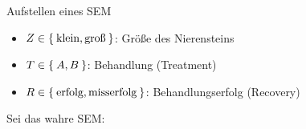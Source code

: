 \begin{frame}{Aufstellen eines SEM}
    \begin{itemize}[label={}]
        \item $Z \in \Set{\text{klein}, \text{groß}}$: Größe des Nierensteins
        \item $T \in \Set{A, B}$: Behandlung (Treatment)
        \item $R \in \Set{\text{erfolg}, \text{misserfolg}}$: Behandlungserfolg (Recovery)
    \end{itemize}

    Sei das wahre SEM:
    \begin{figure}[!h]
        \centering
    \end{figure}
\end{frame}